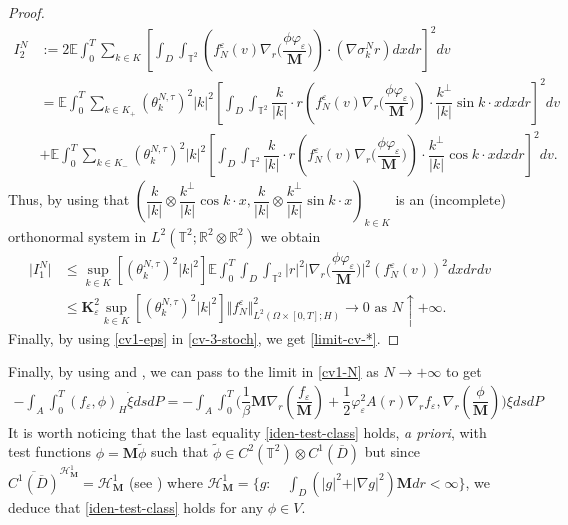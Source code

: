 \documentclass[a4paper,12pt, reqno]{amsart}
\newcommand{\E}{\ensuremath{\mathbb{E}}}
\newcommand{\T}{\mathbb{T}}
\begin{document}
\begin{proof}
\begin{align*}
			I_2^N&:= 2\E\int_0^T\sum_{k\in K}\left[\int_{D}\int_{\mathbb{T}^2}\left(f_N^\varepsilon(v)\nabla_r\big(\dfrac{\phi \varphi_\varepsilon}{\mathbf{M}}\big)\right)\cdot(\nabla \sigma_k^Nr) dxdr\right]^2dv\\&=\E\int_0^T\sum_{k\in K_+}(\theta^{N,\tau}_{k})^2\vert   k\vert^2\left[\int_{D}\int_{\mathbb{T}^2}\dfrac{k}{\vert   k\vert}\cdot   r\left(f_N^\varepsilon(v)\nabla_r\big(\dfrac{\phi \varphi_\varepsilon}{\mathbf{M}}\big)\right)\cdot  \dfrac{k^\perp}{\vert   k\vert}\sin{k\cdot  x}dxdr\right]^2dv\\&+\E\int_0^T\sum_{k\in K_-}(\theta^{N,\tau}_{k})^2\vert   k\vert^2\left[\int_{D}\int_{\mathbb{T}^2}\dfrac{k}{\vert   k\vert}\cdot   r\left(f_N^\varepsilon(v)\nabla_r\big(\dfrac{\phi \varphi_\varepsilon}{\mathbf{M}}\big)\right)\cdot  \dfrac{k^\perp}{\vert   k\vert}\cos{k\cdot  x}dxdr\right]^2dv.
		\end{align*}
		Thus,    by  using   that $(\dfrac{k}{\vert   k\vert}\otimes\dfrac{k^\perp}{\vert   k\vert}\cos{k\cdot  x},\dfrac{k}{\vert   k\vert}\otimes\dfrac{k^\perp}{\vert   k\vert}\sin{k\cdot  x})_{k\in  K}$  is an
		(incomplete) orthonormal system in  $L^2(\T^2;\mathbb{R}^2\otimes \mathbb{R}^2)$    we  obtain
		\begin{align*}
			\vert I_1^N\vert&\leq     \sup_{k\in  K}[(\theta^{N,\tau}_{k})^2\vert   k\vert^2]\E\int_0^T\int_{D}\int_{\mathbb{T}^2}   \vert    r\vert^2 \vert \nabla_r\big(\dfrac{\phi \varphi_\varepsilon}{\mathbf{M}}\big)\vert^2\left(f_N^\varepsilon(v)\right)^2dxdrdv\\
			&\leq  \mathbf{K}_\varepsilon^2\sup_{k\in  K}[(\theta^{N,\tau}_{k})^2\vert   k\vert^2]\Vert  f_N^\varepsilon\Vert_{L^2(\Omega\times[0,T];H)}^2\to   0   \text{  as  }   N\uparrow   +\infty.
		\end{align*}
Finally, by using \eqref{cv1-eps} in  \eqref{cv-3-stoch},  we get \eqref{limit-cv-*}.
\end{proof}
Finally, by using  and , we can pass to the limit in \eqref{cv1-N} as $N\to +\infty$ to get
	\begin{align}\label{iden-test-class}
		-\int_A\int_0^T 
                (f_\varepsilon, \phi)_H \dot\xi  dsdP=-\int_A\int_0^T\big(\dfrac{1}{\beta}\mathbf{M}\nabla_r(\dfrac{f_\varepsilon}{\mathbf{M}})+\dfrac{1}{2}\varphi_\varepsilon^2A(r)\nabla_rf_\varepsilon,\nabla_r\left(\dfrac{\phi}{\mathbf{M}}\right)\big) \xi dsdP\end{align}
                It is worth noticing that the last equality \eqref{iden-test-class} holds, \textit{a priori}, with test functions $\phi=\mathbf{M} \widetilde{\phi}$ such that $  \widetilde{\phi}\in C^2(\T^2)\otimes C^1(\overline{D})$ but since $    \overline{C^1(\overline{D})}^{\mathcal{H}^1_\mathbf{M}}=\mathcal{H}^1_{\mathbf{M}}$ (see \cite[Proposition B.2]{Masmoudi2013}) where $\mathcal{H}^1_{\mathbf{M}}=\{g: \quad \int_D(\vert g\vert^2+\vert \nabla g\vert^2)\mathbf{M} dr<\infty\}$, we deduce that \eqref{iden-test-class} holds for any $\phi\in V.$  \\ 
                
\end{document}
